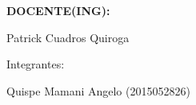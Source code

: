 \documentclass[12pt,letterpaper]{article}
\begin{document}
\begin{titlepage}
\begin{center}
\vspace*{0.3in}
\begin{Large}
\textbf{DOCENTE(ING):} \\
\end{Large}

\vspace*{0.1in}
\begin{large}
 Patrick Cuadros Quiroga\\
\end{large}

\vspace*{0.2in}
\vspace*{0.1in}
\begin{large}
Integrantes: \\
\begin{flushleft}


Quispe Mamani Angelo        \hfill	(2015052826) \\

\end{flushleft}
\end{large}
\end{center}

\end{titlepage}


\tableofcontents %
\thispagestyle{empty} %
\newpage
\setcounter{page}{1} %

 	 	
\end{document}

